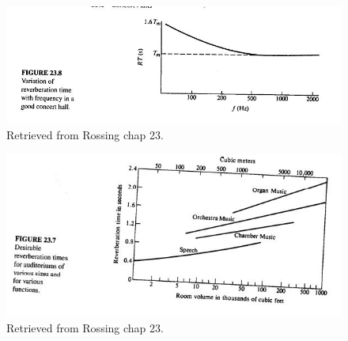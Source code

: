 \documentclass{article}
\begin{document}
\begin{figure}[H]
    \centering
    \includegraphics[scale=0.8]{figures/figure23_8.jpg}
   \caption{Retrieved from Rossing chap 23.}
    \label{fig:nc}
\end{figure}


\begin{figure}[H]
    \centering
    \includegraphics[scale=0.9]{figures/figure23_7.jpg}
   \caption{Retrieved from Rossing chap 23.}
    \label{fig:nc}
\end{figure}
\end{document}
